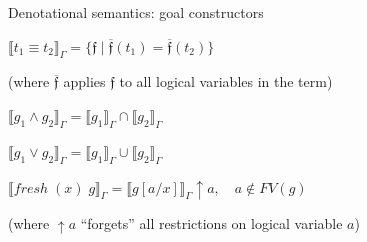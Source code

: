 \documentclass{beamer}
\theoremstyle{definition}
\theoremstyle{plain} %
\begin{document}
\begin{frame}{Denotational semantics: goal constructors}

$\llbracket t_1 \equiv t_2 \rrbracket_{\Gamma} = \{{\mathfrak f} \mid \overline{\mathfrak f}(t_1) = \overline{\mathfrak f}(t_2) \}$

\vskip2mm

\qquad (where $\overline{\mathfrak f}$ applies ${\mathfrak f}$ to all logical variables in the term)

\vskip5mm

$\llbracket g_1 \land g_2 \rrbracket_{\Gamma} = \llbracket g_1 \rrbracket_{\Gamma} \cap \llbracket g_2 \rrbracket_{\Gamma}$

\vskip5mm

$\llbracket g_1 \lor g_2 \rrbracket_{\Gamma} = \llbracket g_1 \rrbracket_{\Gamma} \cup \llbracket g_2 \rrbracket_{\Gamma}$

\vskip5mm

$\llbracket fresh \; (x) \; g \rrbracket_{\Gamma} = \llbracket g[a/x] \rrbracket_{\Gamma} \uparrow a, \quad a \notin FV(g)$

\vskip2mm

\qquad (where $\uparrow a$ ``forgets'' all restrictions on logical variable $a$)

\end{frame}
\end{document}
